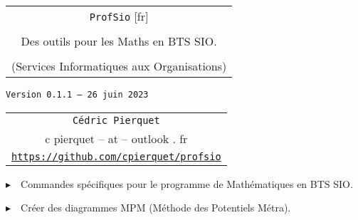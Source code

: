 \documentclass[french,a4paper,11pt]{article}
\def\TPversion{0.1.1}
\def\TPdate{26 juin 2023}
\begin{document}
\setlength{\aweboxleftmargin}{0.07\linewidth}
\setlength{\aweboxcontentwidth}{0.93\linewidth}
\setlength{\aweboxvskip}{8pt}

\pagestyle{fancy}

\thispagestyle{empty}

\vspace{2cm}

\begin{center}
	\begin{minipage}{0.75\linewidth}
	\begin{tcolorbox}[colframe=yellow,colback=yellow!15]
		\begin{center}
			\begin{tabular}{c}
				{\Huge \texttt{ProfSio} [fr]}\\
				\\
				{\LARGE Des outils pour les Maths en BTS SIO.} \\
				\\
				{\large (Services Informatiques aux Organisations)}
			\end{tabular}
			
			\bigskip
			
			{\small \texttt{Version \TPversion{} -- \TPdate}}
		\end{center}
	\end{tcolorbox}
\end{minipage}
\end{center}

\begin{center}
	\begin{tabular}{c}
	\texttt{Cédric Pierquet}\\
	{\ttfamily c pierquet -- at -- outlook . fr}\\
	\texttt{\url{https://github.com/cpierquet/profsio}}
\end{tabular}
\end{center}

\vspace{0.15cm}

{$\blacktriangleright$~~Commandes spécifiques pour le programme de Mathématiques en BTS SIO\footnotemark{}.}

\vspace{0.15cm}

{$\blacktriangleright$~~Créer des diagrammes MPM\footnotemark{} (Méthode des Potentiels Métra).}
\end{document}
